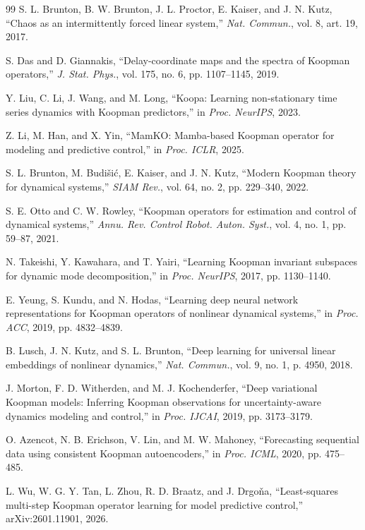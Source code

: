 ﻿\documentclass[journal]{IEEEtran}
\begin{document}
\begin{thebibliography}{99}
S. L. Brunton, B. W. Brunton, J. L. Proctor, E. Kaiser, and J. N. Kutz, ``Chaos as an intermittently forced linear system,'' \emph{Nat. Commun.}, vol. 8, art. 19, 2017.

S. Das and D. Giannakis, ``Delay-coordinate maps and the spectra of Koopman operators,'' \emph{J. Stat. Phys.}, vol. 175, no. 6, pp. 1107--1145, 2019.

Y. Liu, C. Li, J. Wang, and M. Long, ``Koopa: Learning non-stationary time series dynamics with Koopman predictors,'' in \emph{Proc. NeurIPS}, 2023.

Z. Li, M. Han, and X. Yin, ``MamKO: Mamba-based Koopman operator for modeling and predictive control,'' in \emph{Proc. ICLR}, 2025.

S. L. Brunton, M. Budi\v{s}i\'c, E. Kaiser, and J. N. Kutz, ``Modern Koopman theory for dynamical systems,'' \emph{SIAM Rev.}, vol. 64, no. 2, pp. 229--340, 2022.

S. E. Otto and C. W. Rowley, ``Koopman operators for estimation and control of dynamical systems,'' \emph{Annu. Rev. Control Robot. Auton. Syst.}, vol. 4, no. 1, pp. 59--87, 2021.

N. Takeishi, Y. Kawahara, and T. Yairi, ``Learning Koopman invariant subspaces for dynamic mode decomposition,'' in \emph{Proc. NeurIPS}, 2017, pp. 1130--1140.

E. Yeung, S. Kundu, and N. Hodas, ``Learning deep neural network representations for Koopman operators of nonlinear dynamical systems,'' in \emph{Proc. ACC}, 2019, pp. 4832--4839.

B. Lusch, J. N. Kutz, and S. L. Brunton, ``Deep learning for universal linear embeddings of nonlinear dynamics,'' \emph{Nat. Commun.}, vol. 9, no. 1, p. 4950, 2018.

J. Morton, F. D. Witherden, and M. J. Kochenderfer, ``Deep variational Koopman models: Inferring Koopman observations for uncertainty-aware dynamics modeling and control,'' in \emph{Proc. IJCAI}, 2019, pp. 3173--3179.

O. Azencot, N. B. Erichson, V. Lin, and M. W. Mahoney, ``Forecasting sequential data using consistent Koopman autoencoders,'' in \emph{Proc. ICML}, 2020, pp. 475--485.

L. Wu, W. G. Y. Tan, L. Zhou, R. D. Braatz, and J. Drgo\v{n}a, ``Least-squares multi-step Koopman operator learning for model predictive control,'' arXiv:2601.11901, 2026.


\end{thebibliography}
\end{document}
